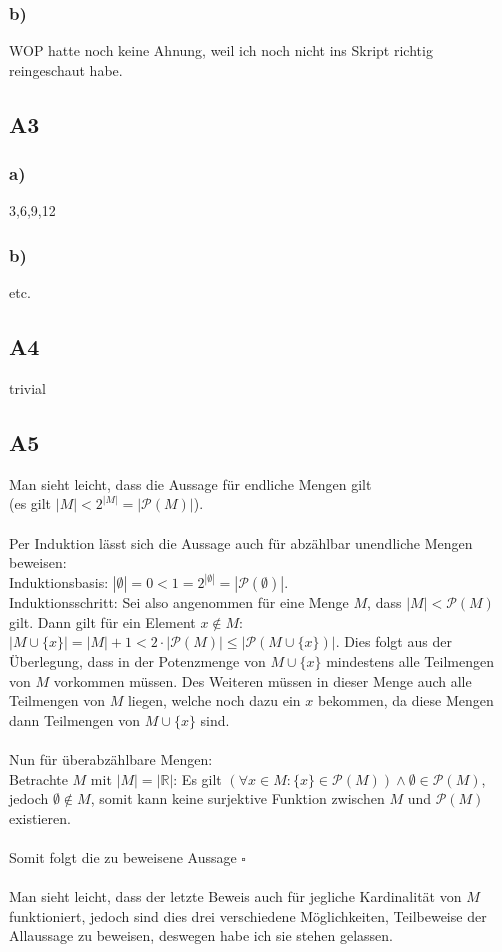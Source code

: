 \documentclass[12pt, a4paper]{article}
\newcommand*{\qed}{\null\nobreak\hfill\ensuremath{\square}}
\begin{document}
\subsubsection*{b)}
WOP hatte noch keine Ahnung, weil ich noch nicht ins Skript richtig reingeschaut habe.
\subsection*{A3}
\subsubsection*{a)}
3,6,9,12
\subsubsection*{b)}
etc.
\subsection*{A4}
trivial
\subsection*{A5}
Man sieht leicht, dass die Aussage für endliche Mengen gilt\\
(es gilt \(|M| < 2^{|M|} = |\mathcal P(M)|\)). \\ \\ Per Induktion lässt sich die Aussage auch für abzählbar unendliche Mengen beweisen:\\
Induktionsbasis: \(|\emptyset| = 0 < 1 = 2^{|\emptyset|} = |\mathcal P(\emptyset)|\). \\
Induktionsschritt: Sei also angenommen für eine Menge \(M\), dass \(|M| < \mathcal{P}(M)\) gilt. Dann gilt für ein Element \(x \not\in M\):\\
\(|M \cup \{x\}| = |M| + 1 < 2\cdot |\mathcal P (M)| \le |\mathcal P(M \cup \{x\})|\). Dies folgt aus der Überlegung, dass in der Potenzmenge von \(M \cup \{x\}\) mindestens alle Teilmengen von \(M\) vorkommen müssen. Des Weiteren müssen in dieser Menge auch alle Teilmengen von \(M\) liegen, welche noch dazu ein \(x\) bekommen, da diese Mengen dann Teilmengen von \(M \cup \{x\}\) sind. \\ \\
Nun für überabzählbare Mengen: \\
Betrachte \(M\) mit \(|M| = |\mathbb R|\): Es gilt \((\forall x \in M: \{x\} \in \mathcal P(M)) \wedge \emptyset \in \mathcal P(M)\), jedoch \(\emptyset \not \in M\), somit kann keine surjektive Funktion zwischen \(M\) und \(\mathcal P(M)\) existieren. \\ \\ Somit folgt die zu beweisene Aussage \qed \\ \\
Man sieht leicht, dass der letzte Beweis auch für jegliche Kardinalität von \(M\) funktioniert, jedoch sind dies drei verschiedene Möglichkeiten, Teilbeweise der Allaussage zu beweisen, deswegen habe ich sie stehen gelassen.
\end{document}
